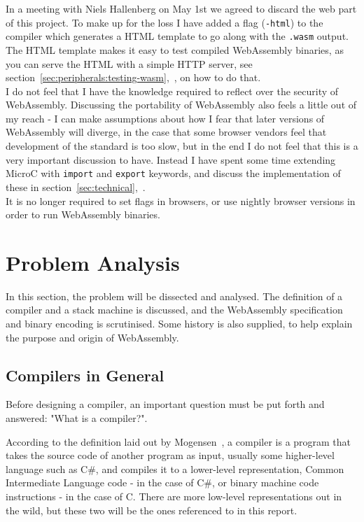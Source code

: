 \documentclass[a4paper]{article}
\begin{document}
In a meeting with Niels Hallenberg on May 1st we agreed to discard the web part of this project. To make up for the loss I have added a flag (\texttt{-html}) to the compiler which generates a HTML template to go along with the \texttt{.wasm} output. The HTML template makes it easy to test compiled WebAssembly binaries, as you can serve the HTML with a simple HTTP server, see section~\ref{sec:peripherals:testing-wasm},~, on how to do that.\\

\noindent I do not feel that I have the knowledge required to reflect over the security of WebAssembly. Discussing the portability of WebAssembly also feels a little out of my reach - I can make assumptions about how I fear that later versions of WebAssembly will diverge, in the case that some browser vendors feel that development of the standard is too slow, but in the end I do not feel that this is a very important discussion to have. Instead I have spent some time extending MicroC with \texttt{import} and \texttt{export} keywords, and discuss the implementation of these in section~\ref{sec:technical},~.\\

\noindent It is no longer required to set flags in browsers, or use nightly browser versions in order to run WebAssembly binaries.

\newpage
\section{Problem Analysis}
\label{sec:problem-analysis}
In this section, the problem will be dissected and analysed. The definition of a compiler and a stack machine is discussed, and the WebAssembly specification and binary encoding is scrutinised. Some history is also supplied, to help explain the purpose and origin of WebAssembly.

\subsection{Compilers in General}
\label{sec:problem-analysis:compilers}
Before designing a compiler, an important question must be put forth and answered: "What is a compiler?".

According to the definition laid out by Mogensen~\cite{BCD}, a compiler is a program that takes the source code of another program as input, usually some higher-level language such as C\#, and compiles it to a lower-level representation, Common Intermediate Language code - in the case of C\#, or binary machine code instructions - in the case of C. There are more low-level representations out in the wild, but these two will be the ones referenced to in this report.
\end{document}
